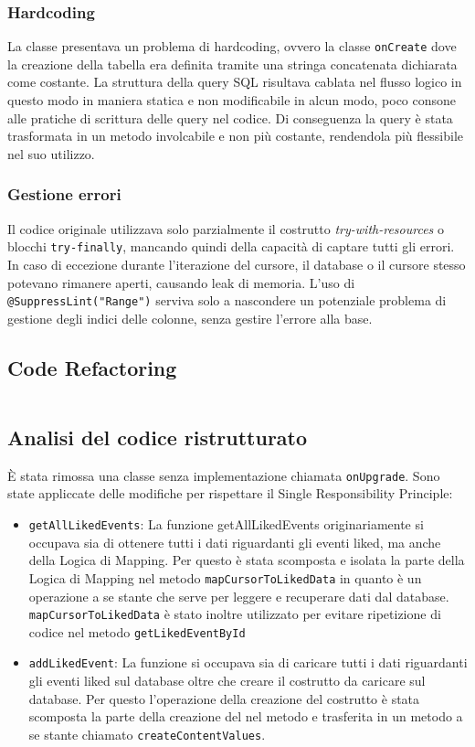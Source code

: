 \subsubsection{Hardcoding}
La classe presentava un problema di hardcoding, ovvero la classe \texttt{onCreate} dove la creazione della tabella era definita tramite una stringa concatenata dichiarata come costante. La struttura della query SQL risultava cablata nel flusso logico in questo modo in maniera statica e non modificabile in alcun modo, poco consone alle pratiche di scrittura delle query nel codice. Di conseguenza la query è stata trasformata in un metodo involcabile e non più costante, rendendola più flessibile nel suo utilizzo.

\subsubsection{Gestione errori}
Il codice originale utilizzava solo parzialmente il costrutto \textit{try-with-resources} o blocchi \texttt{try-finally}, mancando quindi della capacità di captare tutti gli errori. In caso di eccezione durante l'iterazione del cursore, il database o il cursore stesso potevano rimanere aperti, causando leak di memoria. L'uso di \texttt{@SuppressLint("Range")} serviva solo a nascondere un potenziale problema di gestione degli indici delle colonne, senza gestire l'errore alla base.

\subsection{Code Refactoring}
\inputminted[linenos, frame=lines]{java}{../new/DBHelperLiked.java}

\subsection{Analisi del codice ristrutturato}
È stata rimossa una classe senza implementazione chiamata \texttt{onUpgrade}. Sono state appliccate delle modifiche per rispettare il Single Responsibility Principle:

\begin{itemize}
    \item \verb|getAllLikedEvents|: La funzione getAllLikedEvents originariamente si occupava sia di ottenere tutti i dati riguardanti gli eventi liked, ma anche della Logica di Mapping. Per questo è stata scomposta e isolata la parte della Logica di Mapping nel metodo \verb|mapCursorToLikedData| in quanto è un operazione a se stante che serve per leggere e recuperare dati dal database. \verb|mapCursorToLikedData| è stato inoltre utilizzato per evitare ripetizione di codice nel metodo   \verb|getLikedEventById|
    \item \verb|addLikedEvent|: La funzione si occupava sia di caricare tutti i dati riguardanti gli eventi liked sul database oltre che creare il costrutto da caricare sul database. Per questo l'operazione della creazione del costrutto è stata scomposta la parte della creazione del  nel metodo e trasferita in un metodo a se stante chiamato \verb|createContentValues|. 



\end{itemize}

